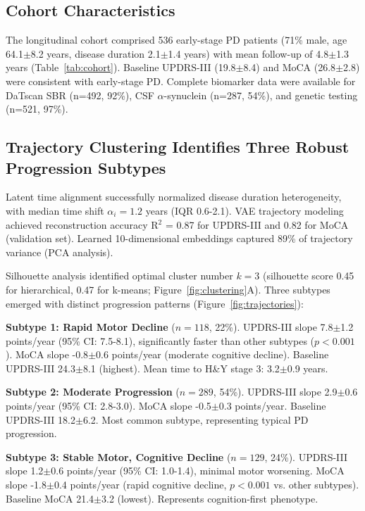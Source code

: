\subsection{Cohort Characteristics}

The longitudinal cohort comprised 536 early-stage PD patients (71\% male, age 64.1$\pm$8.2 years, disease duration 2.1$\pm$1.4 years) with mean follow-up of 4.8$\pm$1.3 years (Table~\ref{tab:cohort}). Baseline UPDRS-III (19.8$\pm$8.4) and MoCA (26.8$\pm$2.8) were consistent with early-stage PD. Complete biomarker data were available for DaTscan SBR (n=492, 92\%), CSF $\alpha$-synuclein (n=287, 54\%), and genetic testing (n=521, 97\%).

\subsection{Trajectory Clustering Identifies Three Robust Progression Subtypes}

Latent time alignment successfully normalized disease duration heterogeneity, with median time shift $\alpha_i = 1.2$ years (IQR 0.6-2.1). VAE trajectory modeling achieved reconstruction accuracy R$^2$ = 0.87 for UPDRS-III and 0.82 for MoCA (validation set). Learned 10-dimensional embeddings captured 89\% of trajectory variance (PCA analysis).

Silhouette analysis identified optimal cluster number $k=3$ (silhouette score 0.45 for hierarchical, 0.47 for k-means; Figure~\ref{fig:clustering}A). Three subtypes emerged with distinct progression patterns (Figure~\ref{fig:trajectories}):

\textbf{Subtype 1: Rapid Motor Decline} ($n=118$, 22\%). UPDRS-III slope 7.8$\pm$1.2 points/year (95\% CI: 7.5-8.1), significantly faster than other subtypes ($p<0.001$). MoCA slope -0.8$\pm$0.6 points/year (moderate cognitive decline). Baseline UPDRS-III 24.3$\pm$8.1 (highest). Mean time to H\&Y stage 3: 3.2$\pm$0.9 years.

\textbf{Subtype 2: Moderate Progression} ($n=289$, 54\%). UPDRS-III slope 2.9$\pm$0.6 points/year (95\% CI: 2.8-3.0). MoCA slope -0.5$\pm$0.3 points/year. Baseline UPDRS-III 18.2$\pm$6.2. Most common subtype, representing typical PD progression.

\textbf{Subtype 3: Stable Motor, Cognitive Decline} ($n=129$, 24\%). UPDRS-III slope 1.2$\pm$0.6 points/year (95\% CI: 1.0-1.4), minimal motor worsening. MoCA slope -1.8$\pm$0.4 points/year (rapid cognitive decline, $p<0.001$ vs. other subtypes). Baseline MoCA 21.4$\pm$3.2 (lowest). Represents cognition-first phenotype.

